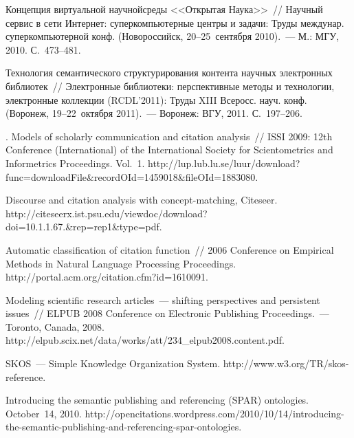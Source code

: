 \begin{multicols}{2}
{{\begin{thebibliography}{99}
Концепция виртуальной научной\linebreak среды <<Открытая Наука>>~// Научный сервис в сети 
Интернет: суперкомпьютерные центры и задачи: \mbox{Труды} междунар. суперкомпьютерной 
конф. (Новороссийск, 20--25~сентября 2010).~--- М.: МГУ, 2010. С.~473--481. 


Технология семантического структурирования контента научных электронных библиотек~// 
Электронные библиотеки: перспективные методы и технологии, электронные коллекции 
(RCDL'2011): Труды XIII Всеросс. науч. конф. (Воронеж, 19--22~октября 2011).~--- Воронеж: 
ВГУ, 2011. С.~197--206.

. 
Models of scholarly communication and citation analysis~// ISSI 2009: 12th  Conference 
(International)  of the International Society for Scientometrics and Informetrics Proceedings. 
Vol.~1. {\sf 
http://lup.lub.lu.se/luur/download?func=downloadFile\linebreak \&recordOId=1459018\&fileOId=1883080}.

Discourse and citation 
analysis with concept-matching, Citeseer. {\sf 
http://\linebreak citeseerx.ist.psu.edu/viewdoc/download?doi=10.1.1.67.\&rep=rep1\&type=pdf}.

Automatic classification of citation function~// 2006 Conference on Empirical Methods in Natural 
Language Processing Proceedings. {\sf http://portal.acm.org/citation.cfm?id=1610091}.

Modeling scientific research articles~--- shifting perspectives and persistent issues~// ELPUB 2008 
Conference on Electronic Publishing Proceedings.~--- Toronto, Canada, 2008. {\sf 
http://elpub.scix.net/\linebreak data/works/att/234\_elpub2008.content.pdf}.

SKOS~--- Simple Knowledge Organization System. {\sf http://www.w3.org/TR/skos-reference}.

Introducing the semantic publishing and referencing (SPAR) ontologies. October~14, 2010. {\sf 
http://\linebreak opencitations.wordpress.com/2010/10/14/introducing-\linebreak the-semantic-publishing-and-referencing-spar-ontologies}.


\end{thebibliography}}}
\end{multicols}
